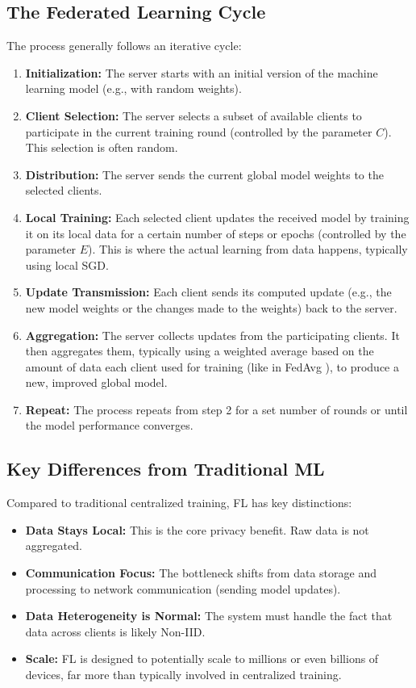 \documentclass[conference]{IEEEtran}
\begin{document}
\subsection{The Federated Learning Cycle}
The process generally follows an iterative cycle: 
\begin{enumerate}
    \item \textbf{Initialization:} The server starts with an initial version of the machine learning model (e.g., with random weights).
    \item \textbf{Client Selection:} The server selects a subset of available clients to participate in the current training round (controlled by the parameter $C$). This selection is often random.
    \item \textbf{Distribution:} The server sends the current global model weights to the selected clients.
    \item \textbf{Local Training:} Each selected client updates the received model by training it on its local data for a certain number of steps or epochs (controlled by the parameter $E$). This is where the actual learning from data happens, typically using local SGD.
    \item \textbf{Update Transmission:} Each client sends its computed update (e.g., the new model weights or the changes made to the weights) back to the server.
    \item \textbf{Aggregation:} The server collects updates from the participating clients. It then aggregates them, typically using a weighted average based on the amount of data each client used for training (like in FedAvg \cite{b2}), to produce a new, improved global model.
    \item \textbf{Repeat:} The process repeats from step 2 for a set number of rounds or until the model performance converges.
\end{enumerate}

\subsection{Key Differences from Traditional ML}
Compared to traditional centralized training, FL has key distinctions:
\begin{itemize}
    \item \textbf{Data Stays Local:} This is the core privacy benefit. Raw data is not aggregated.
    \item \textbf{Communication Focus:} The bottleneck shifts from data storage and processing to network communication (sending model updates).
    \item \textbf{Data Heterogeneity is Normal:} The system must handle the fact that data across clients is likely Non-IID.
    \item \textbf{Scale:} FL is designed to potentially scale to millions or even billions of devices, far more than typically involved in centralized training.
\end{itemize}
\end{document}
